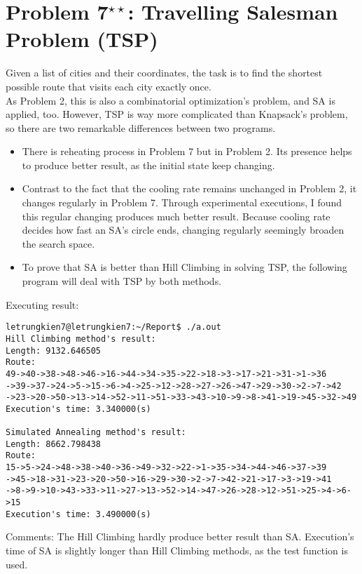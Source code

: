 \documentclass[11pt]{article}
\begin{document}
\section{Problem 7${}^{\star\star}$: \normalsize Travelling Salesman Problem (TSP)}
\indent Given a list of cities and their coordinates, the task is to find the shortest possible route that visits each city exactly once.\\
\indent As Problem 2, this is also a combinatorial optimization's problem, and SA is applied, too. However, TSP is way more complicated than Knapsack's problem, so there are two remarkable differences between two programs. 
\begin{itemize}
\item There is reheating process in Problem 7 but in Problem 2. Its presence helps to produce better result, as the initial state keep changing.
\item Contrast to the fact that the cooling rate remains unchanged in Problem 2, it changes regularly in Problem 7. Through experimental executions, I found this regular changing produces much better result. Because cooling rate decides how fast an SA's circle ends, changing regularly seemingly broaden the search space.
\item To prove that SA is better than Hill Climbing in solving TSP, the following program will deal with TSP by both methods.
\end{itemize} 
Executing result:
%

\begin{verbatim}
letrungkien7@letrungkien7:~/Report$ ./a.out 
Hill Climbing method's result:
Length: 9132.646505
Route:
49->40->38->48->46->16->44->34->35->22->18->3->17->21->31->1->36
->39->37->24->5->15->6->4->25->12->28->27->26->47->29->30->2->7->42
->23->20->50->13->14->52->11->51->33->43->10->9->8->41->19->45->32->49
Execution's time: 3.340000(s)

Simulated Annealing method's result:
Length: 8662.798438
Route:
15->5->24->48->38->40->36->49->32->22->1->35->34->44->46->37->39
->45->18->31->23->20->50->16->29->30->2->7->42->21->17->3->19->41
->8->9->10->43->33->11->27->13->52->14->47->26->28->12->51->25->4->6->15
Execution's time: 3.490000(s)
\end{verbatim}
Comments: The Hill Climbing hardly produce better result than SA. Execution's time of SA is slightly longer than Hill Climbing methods, as the test function is used.
\newpage
\end{document}
